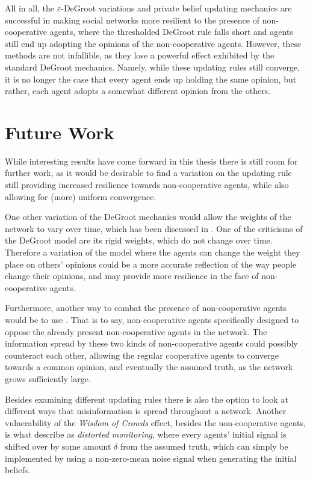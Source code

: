 \documentclass{article}
\begin{document}
\noindent All in all, the $\varepsilon$-DeGroot variations and private belief updating mechanics are successful in making social networks more resilient to the presence of non-cooperative agents, where the thresholded DeGroot rule falls short and agents still end up adopting the opinions of the non-cooperative agents. However, these methods are not infallible, as they lose a powerful effect exhibited by the standard DeGroot mechanics. Namely, while these updating rules still converge, it is no longer the case that every agent ends up holding the same opinion, but rather, each agent adopts a somewhat different opinion from the others.

\section{Future Work}

While interesting results have come forward in this thesis there is still room for further work, as it would be desirable to find a variation on the updating rule still providing increased resilience towards non-cooperative agents, while also allowing for (more) uniform convergence.

\noindent One other variation of the DeGroot mechanics would allow the weights of the network to vary over time, which has been discussed in \cite{chatterjee1977stochastic}. One of the criticisms of the DeGroot model are its rigid weights, which do not change over time. Therefore a variation of the model where the agents can change the weight they place on others' opinions could be a more accurate reflection of the way people change their opinions, and may provide more resilience in the face of non-cooperative agents.

\noindent Furthermore, another way to combat the presence of non-cooperative agents would be to use . That is to say, non-cooperative agents specifically designed to oppose the already present non-cooperative agents in the network. The information spread by these two kinds of non-cooperative agents could possibly counteract each other, allowing the regular cooperative agents to converge towards a common opinion, and eventually the assumed truth, as the network grows sufficiently large.

\noindent Besides examining different updating rules there is also the option to look at different ways that misinformation is spread throughout a network. Another vulnerability of the \emph{Wisdom of Crowds} effect, besides the non-cooperative agents, is what \cite{amir2021robust} describe as \emph{distorted monitoring}, where every agents' initial signal is shifted over by some amount $\delta$ from the assumed truth, which can simply be implemented by using a non-zero-mean noise signal when generating the initial beliefs.
\end{document}
